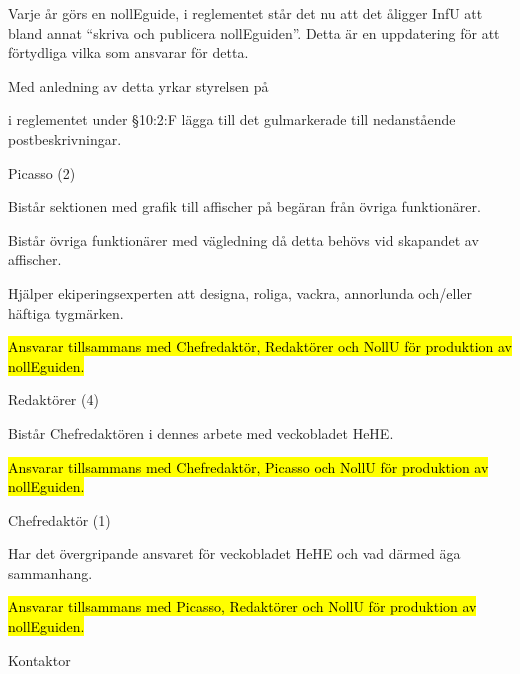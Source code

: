\documentclass[../_main/handlingar.tex]{subfiles}
\begin{document}
Varje år görs en nollEguide, i reglementet står det nu att det åligger InfU att bland annat ``skriva och publicera nollEguiden''. Detta är en uppdatering för att förtydliga vilka som ansvarar för detta.

Med anledning av detta yrkar styrelsen på
\begin{attsatser}
    \att i reglementet under \S10:2:F lägga till det gulmarkerade till nedanstående postbeskrivningar.\par
    Picasso (2)
    \begin{dashlist}
            \item Bistår sektionen med grafik till affischer på begäran från övriga funktionärer.
            \item Bistår övriga funktionärer med vägledning då detta behövs vid skapandet av affischer.
            \item Hjälper ekiperingsexperten att designa, roliga, vackra, annorlunda och/eller häftiga tygmärken.
            \item \hl{Ansvarar tillsammans med Chefredaktör, Redaktörer och NollU för produktion av nollEguiden.}
        \end{dashlist}
        Redaktörer (4)
      		\begin{dashlist}
      			\item Bistår Chefredaktören i dennes arbete med veckobladet HeHE.
            \item \hl{Ansvarar tillsammans med Chefredaktör, Picasso och NollU för produktion av nollEguiden.}
          \end{dashlist}
          Chefredaktör (1)
          		\begin{dashlist}
          			\item Har det övergripande ansvaret för veckobladet HeHE och vad därmed äga sammanhang.
                \item \hl{Ansvarar tillsammans med Picasso, Redaktörer och NollU för produktion av nollEguiden.}
          		\end{dashlist}

\end{attsatser}

\begin{signatures}{1}
    \ist
    \signature{\sekr}{Kontaktor}
\end{signatures}
\end{document}
